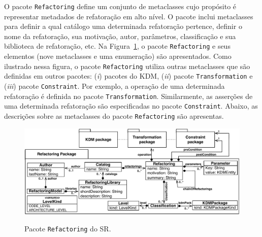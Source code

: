 O pacote \texttt{Refactoring} define um conjunto de metaclasses cujo propósito é representar metadados de refatoração em alto nível. O pacote inclui metaclasses para definir a qual catálogo uma determinada refatoração pertence, definir o nome da refatoração, sua motivação, autor, parâmetros, classificação e sua biblioteca de refatoração, etc. Na Figura~\ref{fig:pacote_refactoring_srm}, o pacote \texttt{Refactoring} e seus elementos (nove metaclasses e uma enumeração) são apresentados. Como ilustrado nessa figura, o pacote \texttt{Refactoring} utiliza outras metaclasses que são definidas em outros pacotes: (\textit{i}) pacotes do KDM, (\textit{ii}) pacote \texttt{Transformation} e (\textit{iii}) pacote \texttt{Constraint}. Por exemplo, a operação de uma determinada refatoração é definida no pacote \texttt{Transformation}. Similarmente, as asserções de uma determinada refatoração são especificadas no pacote \texttt{Constraint}. Abaixo, as descrições sobre as metaclasses do pacote \texttt{Refactoring} são apresentas. 

\begin{figure}[h]
	\centering
		\caption{Pacote \texttt{Refactoring} do SR.}
	\includegraphics[scale=0.70]{images/pacoteRefactoring2}
	\label{fig:pacote_refactoring_srm}
	\fautor
\end{figure}

